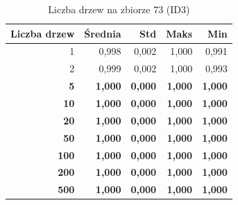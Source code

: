 \begin{table}[htbp]
\centering
\small
\setlength{\tabcolsep}{6pt}
\renewcommand{\arraystretch}{1.2}
\caption{Liczba drzew na zbiorze 73 (ID3)}
\label{tab:ID3_tree_count_73}
\begin{tabular}{r|r|r|r|r}
\toprule
Liczba drzew & Średnia & Std & Maks & Min \\
\hline
1 & 0,998 & 0,002 & 1,000 & 0,991 \\
2 & 0,999 & 0,002 & 1,000 & 0,993 \\
\textbf{5} & \textbf{1,000} & \textbf{0,000} & \textbf{1,000} & \textbf{1,000} \\
\textbf{10} & \textbf{1,000} & \textbf{0,000} & \textbf{1,000} & \textbf{1,000} \\
\textbf{20} & \textbf{1,000} & \textbf{0,000} & \textbf{1,000} & \textbf{1,000} \\
\textbf{50} & \textbf{1,000} & \textbf{0,000} & \textbf{1,000} & \textbf{1,000} \\
\textbf{100} & \textbf{1,000} & \textbf{0,000} & \textbf{1,000} & \textbf{1,000} \\
\textbf{200} & \textbf{1,000} & \textbf{0,000} & \textbf{1,000} & \textbf{1,000} \\
\textbf{500} & \textbf{1,000} & \textbf{0,000} & \textbf{1,000} & \textbf{1,000} \\
\bottomrule
\end{tabular}
\end{table}
